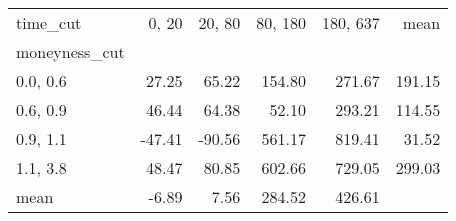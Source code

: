 \begin{tabular}{lrrrrr}
\toprule
time\_cut &  0, 20 &  20, 80 &  80, 180 &  180, 637 &   mean \\
moneyness\_cut &          &           &            &             &        \\
\midrule
0.0, 0.6    &    27.25 &     65.22 &     154.80 &      271.67 & 191.15 \\
0.6, 0.9    &    46.44 &     64.38 &      52.10 &      293.21 & 114.55 \\
0.9, 1.1    &   -47.41 &    -90.56 &     561.17 &      819.41 &  31.52 \\
1.1, 3.8    &    48.47 &     80.85 &     602.66 &      729.05 & 299.03 \\
mean          &    -6.89 &      7.56 &     284.52 &      426.61 &        \\
\bottomrule
\end{tabular}
